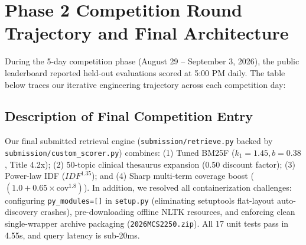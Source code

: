 ﻿\documentclass[9pt,a4paper]{article}
\begin{document}
\clearpage

\section{Phase 2 Competition Round Trajectory and Final Architecture}
During the 5-day competition phase (August 29 -- September 3, 2026), the public leaderboard reported held-out evaluations scored at 5:00 PM daily. The table below traces our iterative engineering trajectory across each competition day:

\begin{table}[H]
\centering
\small
\caption{Phase 2 Competition Round Leaderboard Trajectory (Held-out Test Collection)}
\vspace{-0.1cm}
\end{table}
\vspace{-0.2cm}

\subsection{Description of Final Competition Entry}
Our final submitted retrieval engine (\texttt{submission/retrieve.py} backed by \texttt{submission/custom\_scorer.py}) combines: (1) Tuned BM25F ($k_1=1.45, b=0.38$, Title 4.2x); (2) 50-topic clinical thesaurus expansion (0.50 discount factor); (3) Power-law IDF ($IDF^{1.35}$); and (4) Sharp multi-term coverage boost ($(1.0 + 0.65 \times \text{cov}^{1.8})$). In addition, we resolved all containerization challenges: configuring \texttt{py\_modules=[]} in \texttt{setup.py} (eliminating setuptools flat-layout auto-discovery crashes), pre-downloading offline NLTK resources, and enforcing clean single-wrapper archive packaging (\texttt{2026MCS2250.zip}). All 17 unit tests pass in 4.55s, and query latency is sub-20ms.
\end{document}
